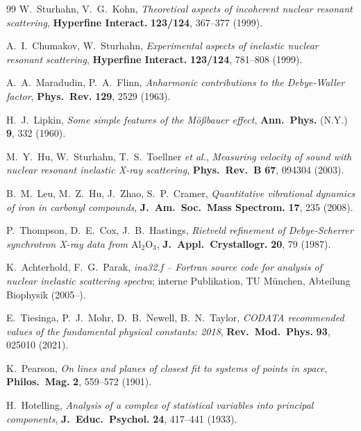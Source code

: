 \documentclass[11pt,a4paper,twoside]{article}
\theoremstyle{remark}
\begin{document}
\begin{thebibliography}{99}
W.~Sturhahn, V.~G.~Kohn,
\emph{Theoretical aspects of incoherent nuclear resonant scattering},
\textbf{Hyperfine Interact.} \textbf{123/124}, 367--377 (1999).

A.~I.~Chumakov, W.~Sturhahn,
\emph{Experimental aspects of inelastic nuclear resonant scattering},
\textbf{Hyperfine Interact.} \textbf{123/124}, 781--808 (1999).

A.~A.~Maradudin, P.~A.~Flinn,
\emph{Anharmonic contributions to the Debye-Waller factor},
\textbf{Phys.\ Rev.} \textbf{129}, 2529 (1963).

H.~J.~Lipkin,
\emph{Some simple features of the M\"o\ss bauer effect},
\textbf{Ann.\ Phys.} (N.Y.) \textbf{9}, 332 (1960).

M.~Y.~Hu, W.~Sturhahn, T.~S.~Toellner \emph{et al.},
\emph{Measuring velocity of sound with nuclear resonant inelastic
X-ray scattering},
\textbf{Phys.\ Rev.\ B} \textbf{67}, 094304 (2003).

B.~M.~Leu, M.~Z.~Hu, J.~Zhao, S.~P.~Cramer,
\emph{Quantitative vibrational dynamics of iron in carbonyl compounds},
\textbf{J.\ Am.\ Soc.\ Mass Spectrom.} \textbf{17}, 235 (2008).

P.~Thompson, D.~E.~Cox, J.~B.~Hastings,
\emph{Rietveld refinement of Debye-Scherrer synchrotron X-ray data
from $\mathrm{Al}_2\mathrm{O}_3$},
\textbf{J.\ Appl.\ Crystallogr.} \textbf{20}, 79 (1987).

K.~Achterhold, F.~G.~Parak,
\emph{ina32.f -- Fortran source code for analysis of nuclear inelastic
scattering spectra}; interne Publikation, TU M\"unchen, Abteilung
Biophysik (2005--).

E.~Tiesinga, P.~J.~Mohr, D.~B.~Newell, B.~N.~Taylor,
\emph{CODATA recommended values of the fundamental physical constants:
2018},
\textbf{Rev.\ Mod.\ Phys.} \textbf{93}, 025010 (2021).


K.~Pearson,
\emph{On lines and planes of closest fit to systems of points in space},
\textbf{Philos.\ Mag.} \textbf{2}, 559--572 (1901).

H.~Hotelling,
\emph{Analysis of a complex of statistical variables into principal
components},
\textbf{J.\ Educ.\ Psychol.} \textbf{24}, 417--441 (1933).


\end{thebibliography}
\end{document}

